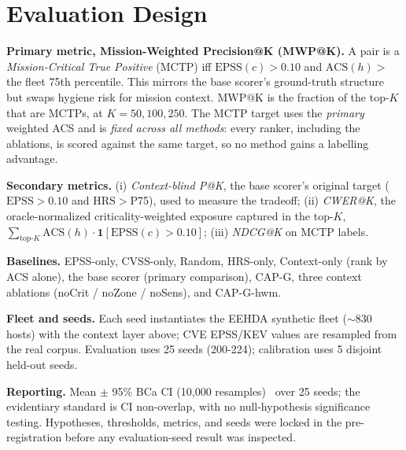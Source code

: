 \section{Evaluation Design}
\label{sec:eval}

\textbf{Primary metric, Mission-Weighted Precision@K (MWP@K).} A pair is a
\emph{Mission-Critical True Positive} (MCTP) iff $\mathrm{EPSS}(c)>0.10$ and
$\mathrm{ACS}(h)>$ the fleet 75th percentile. This mirrors the base scorer's ground-truth
structure but swaps hygiene risk for mission context. $\mathrm{MWP@K}$ is the fraction of
the top-$K$ that are MCTPs, at $K=50,100,250$. The MCTP target uses the \emph{primary}
weighted ACS and is \emph{fixed across all methods}: every ranker, including the
ablations, is scored against the same target, so no method gains a labelling advantage.

\textbf{Secondary metrics.} (i) \emph{Context-blind P@K}, the base scorer's original target
($\mathrm{EPSS}>0.10$ and $\mathrm{HRS}>$P75), used to measure the tradeoff; (ii)
\emph{CWER@K}, the oracle-normalized criticality-weighted exposure captured in the top-$K$,
$\sum_{\text{top-}K}\mathrm{ACS}(h)\cdot\mathbf{1}[\mathrm{EPSS}(c)>0.10]$; (iii)
\emph{NDCG@K} on MCTP labels.

\textbf{Baselines.} EPSS-only, CVSS-only, Random, HRS-only, Context-only (rank by ACS
alone), the base scorer (primary comparison), CAP-G, three context ablations
(noCrit / noZone / noSens), and CAP-G-hwm.

\textbf{Fleet and seeds.} Each seed instantiates the EEHDA synthetic fleet
($\sim$830 hosts) with the context layer above; CVE EPSS/KEV values are resampled from the
real corpus. Evaluation uses 25 seeds (200-224); calibration uses 5 disjoint held-out
seeds.

\textbf{Reporting.} Mean $\pm$ 95\% BCa CI (10{,}000 resamples)~\cite{efron1987bca} over
25 seeds; the evidentiary standard is CI non-overlap, with no null-hypothesis significance
testing. Hypotheses, thresholds, metrics, and
seeds were locked in the pre-registration before any evaluation-seed result was inspected.
